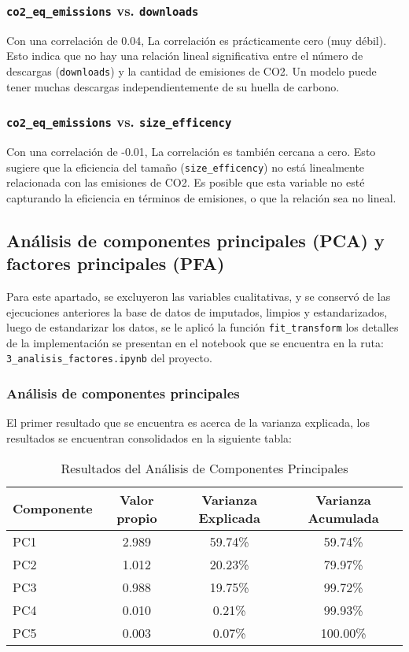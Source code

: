 \documentclass[journal]{IEEEtran}
\begin{document}
	\subsubsection{\texttt{co2\_eq\_emissions} vs. \texttt{downloads}}
	Con una correlación de 0.04, La correlación es prácticamente cero (muy débil). Esto indica que no hay una relación lineal significativa entre el número de descargas (\texttt{downloads}) y la cantidad de emisiones de CO2. Un modelo puede tener muchas descargas independientemente de su huella de carbono.

	\subsubsection{\texttt{co2\_eq\_emissions} vs. \texttt{size\_efficency}}
	Con una correlación de -0.01, La correlación es también cercana a cero. Esto sugiere que la eficiencia del tamaño (\texttt{size\_efficency}) no está linealmente relacionada con las emisiones de CO2. Es posible que esta variable no esté capturando la eficiencia en términos de emisiones, o que la relación sea no lineal.

	\subsection{Análisis de componentes principales (PCA) y factores principales (PFA)}
	Para este apartado, se excluyeron las variables cualitativas, y se conservó de las ejecuciones anteriores la base de datos de imputados, limpios y estandarizados, luego de estandarizar los datos, se le aplicó la función \texttt{fit\_transform} los detalles de la implementación se presentan en el notebook que se encuentra en la ruta: \texttt{3\_analisis\_factores.ipynb} del proyecto.
	\subsubsection{Análisis de componentes principales}
	El primer resultado que se encuentra es acerca de la varianza explicada, los resultados se encuentran consolidados en la siguiente tabla:

	\begin{table}[H]
		\centering
		\caption{Resultados del Análisis de Componentes Principales}
		\begin{tabular}{l c c c}
			\toprule
			Componente & Valor propio & Varianza Explicada & Varianza Acumulada \\
			\midrule
			PC1 & 2.989 & 59.74\% & 59.74\% \\
			PC2 & 1.012 & 20.23\% & 79.97\% \\
			PC3 & 0.988 & 19.75\% & 99.72\% \\
			PC4 & 0.010 & 0.21\%  & 99.93\% \\
			PC5 & 0.003 & 0.07\% & 100.00\% \\
			\bottomrule
		\end{tabular}
		\label{tab:pca_results}
	\end{table}
\end{document}
